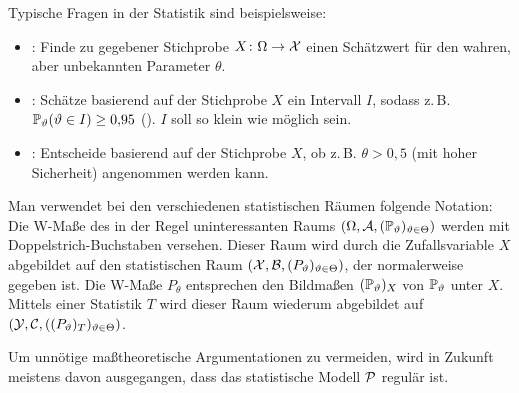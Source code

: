 \begin{Bem}
    Typische Fragen in der Statistik sind beispielsweise:
    \begin{itemize}
        \item
        : Finde zu gegebener Stichprobe $X\colon \Omega \rightarrow \X$
        einen Schätzwert für den wahren, aber unbekannten Parameter $\theta$.
        
        \item
        : Schätze basierend auf der Stichprobe $X$ ein Intervall $I$,
        sodass z.\,B.
        $\PP_\theta(\theta \in I) \ge 0{,}95$ ().
        $I$ soll so klein wie möglich sein.
        
        \item
        : Entscheide basierend auf der Stichprobe $X$, ob z.\,B.
        $\theta > 0{,}5$ (mit hoher Sicherheit) angenommen werden kann.
    \end{itemize}
\end{Bem}

\begin{Bem}
    Man verwendet bei den verschiedenen statistischen Räumen folgende Notation:
    Die W-Maße des in der Regel uninteressanten Raums
    $(\Omega, \A, (\PP_\theta)_{\theta \in \Theta})$
    werden mit Doppelstrich-Buchstaben versehen.
    Dieser Raum wird durch die Zufallsvariable $X$ abgebildet auf den statistischen Raum
    $(\X, \B, (P_\theta)_{\theta \in \Theta})$, der normalerweise gegeben ist.
    Die W-Maße $P_\theta$ entsprechen den Bildmaßen
    $(\PP_\theta)_X$ von $\PP_\theta$ unter $X$.
    Mittels einer Statistik $T$ wird dieser Raum wiederum abgebildet auf
    $(\Y, \C, ((P_\theta)_T)_{\theta \in \Theta})$.
\end{Bem}

\linie

\begin{Bem}
    Um unnötige maßtheoretische Argumentationen zu vermeiden, wird in Zukunft meistens davon
    ausgegangen, dass das statistische Modell $\P$ regulär ist.
\end{Bem}

